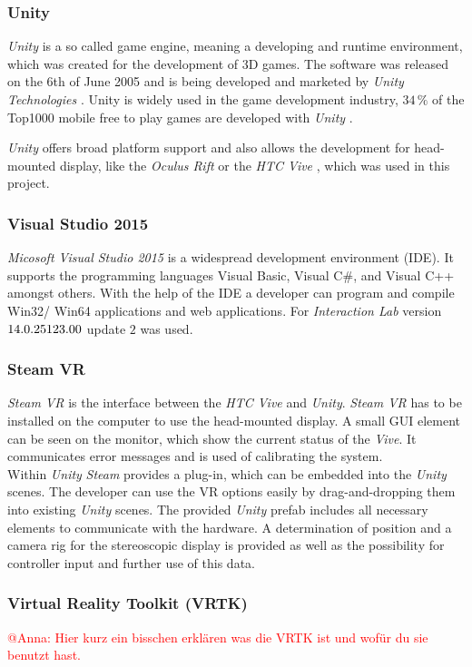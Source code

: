 	
	\subsubsection{Unity}\label{sec:unity}
	
	\textit{Unity} is a so called game engine, meaning a developing and runtime environment, which was created for the development of 3D games. The software was released on the 6th of June 2005 \cite{haas2014histor} and is being developed and marketed by \textit{Unity Technologies} \cite{website:Unity}. Unity is widely used in the game development industry, $34\,\%$ of the Top1000  mobile free to play games are developed with \textit{Unity} \cite{website:UnityPR}. 
	
	\textit{Unity} offers broad platform support \cite{website:UnityMultiPlatform} and also allows the development for head-mounted display, like the \textit{Oculus Rift} \cite{website:UnityVRoverview} or the \textit{HTC Vive} \cite{website:UnityVRoverview}, which was used in this project.
	
	\subsubsection{Visual Studio 2015}\label{sec:VisualStudio}
	
	\textit{Micosoft Visual Studio 2015} is a widespread development environment (IDE). It supports the programming languages Visual Basic, Visual C$\#$, and Visual C++ amongst others. With the help of the IDE a developer can program and compile Win32/ Win64 applications and web applications. For \textit{Interaction Lab} version~$14.0.\-25123.00$ update $2$ was used.
	
	\subsubsection{Steam VR}
	
	\textit{Steam VR} \cite{website:steamVR} is the interface between the \textit{HTC Vive} and \textit{Unity}. \textit{Steam VR} has to be installed on the computer to use the head-mounted display. A small GUI element can be seen on the monitor, which show the current status of the \textit{Vive}. It communicates error messages and is used of calibrating the system. \\
	Within \textit{Unity} \textit{Steam} provides a plug-in, which can be embedded into the \textit{Unity}  scenes. The developer can use the VR options easily by drag-and-dropping them into existing \textit{Unity} scenes. 
	The provided \textit{Unity} prefab includes all necessary elements to communicate with the hardware. A determination of position and a camera rig for the stereoscopic display is provided as well as the possibility for controller input and further use of this data.
	
	\subsubsection{Virtual Reality Toolkit (VRTK)}
	\textcolor{red}{@Anna: Hier kurz ein bisschen erklären was die VRTK ist und wofür du sie benutzt hast.}
	
	\newpage

